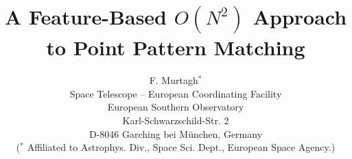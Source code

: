 \pagestyle{empty}

\setlength{\textheight}{8.75in}
\setlength{\columnsep}{2.0pc}
\setlength{\textwidth}{6.8in}
\setlength{\footheight}{0.0in}
\setlength{\topmargin}{0.25in}
\setlength{\headheight}{0.0in}
\setlength{\headsep}{0.0in}
\setlength{\oddsidemargin}{-.19in}
\setlength{\parindent}{1pc}


\makeatletter
\def\@normalsize{\@setsize\normalsize{12pt}\xpt\@xpt
\abovedisplayskip 10pt plus2pt minus5pt\belowdisplayskip \abovedisplayskip
\abovedisplayshortskip \z@ plus3pt\belowdisplayshortskip 6pt plus3pt
minus3pt\let\@listi\@listI} 

\def\subsize{\@setsize\subsize{12pt}\xipt\@xipt}

\def\section{\@startsection {section}{1}{\z@}{24pt plus 2pt minus 2pt}
{12pt plus 2pt minus 2pt}{\large\bf}}

\def\subsection{\@startsection {subsection}{2}{\z@}{12pt plus 2pt minus 2pt}
{12pt plus 2pt minus 2pt}{\subsize\bf}}
\makeatother



\date{}

\title{\Large\bf A Feature-Based $O(N^2)$ Approach to Point Pattern Matching}

\author{F. Murtagh$^*$\\
Space Telescope -- European Coordinating Facility \\
European Southern Observatory  \\
Karl-Schwarzschild-Str. 2\\
D-8046 Garching bei M\"unchen, Germany\\
($^*$ Affiliated to Astrophys. Div., Space 
Sci. Dept., European Space Agency.) }
 
